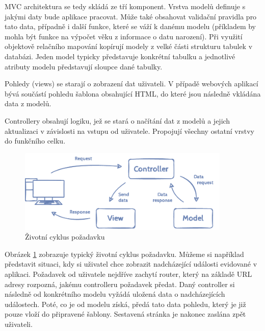 MVC architektura se tedy skládá ze tří komponent. Vrstva modelů definuje s jakými daty bude aplikace pracovat. Může také obsahovat validační pravidla pro tato data, případně i další funkce, které se váží k danému modelu (příkladem by mohla být funkce na výpočet věku z informace o datu narození). Při využití objektově relačního mapování kopírují modely z velké části strukturu tabulek v databázi. Jeden model typicky představuje konkrétní tabulku a jednotlivé atributy modelu představují sloupce dané tabulky.

Pohledy (views) se starají o zobrazení dat uživateli. V případě webových aplikací bývá součástí pohledu šablona obsahující HTML, do které jsou následně vkládána data z modelů.

Controllery obsahují logiku, jež se stará o načítání dat z modelů a jejich aktualizaci v závislosti na vstupu od uživatele. Propojují všechny ostatní vrstvy do funkčního celku.

\begin{figure}[h]
	\caption{Životní cyklus požadavku}
	\label{figure:mvc}
	\centering
	\includegraphics[width=0.9\textwidth]{images/mvc.pdf}
\end{figure}

Obrázek \ref{figure:mvc} zobrazuje typický životní cyklus požadavku. Můžeme si například představit situaci, kdy si uživatel chce zobrazit nadcházející události evidované v aplikaci. Požadavek od uživatele nejdříve zachytí router, který na základě URL adresy rozpozná, jakému controlleru požadavek předat. Daný controller si následně od konkrétního modelu vyžádá uložená data o nadcházejících událostech. Poté, co je od modelu získá, předá tato data pohledu, který je již pouze vloží do připravené šablony. Sestavená stránka je nakonec zaslána zpět uživateli.
